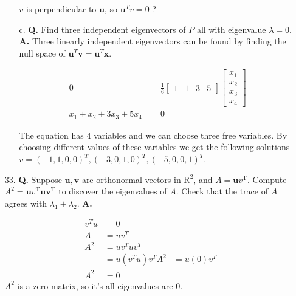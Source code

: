 \documentclass[main.tex]{subfiles}
\begin{document}
\begin{enumerate}
\begin{enumerate}
        $v$ is perpendicular to $\mathbf{u}$, so $\mathbf{u}^{T} v=0$ ?
        
        \item [c.] \textbf{Q.} Find three independent eigenvectors of $P$ all with eigenvalue $\lambda=0$. 
        \textbf{A.}
        Three linearly independent eigenvectors can be found by finding the null space of $\mathbf{u}^{T} \boldsymbol{v}=\mathbf{u}^{T} \mathbf{x}$.

        $$
        \begin{aligned}
        0&=\frac{1}{6}\left[\begin{array}{llll}
        1 & 1 & 3 & 5
        \end{array}\right]\left[\begin{array}{l}
        x_{1} \\
        x_{2} \\
        x_{3} \\
        x_{4}
        \end{array}\right]\\
        x_{1}+x_{2}+3 x_{3}+5 x_{4}&=0
        \end{aligned}
        $$

        The equation has 4 variables and we can choose three free variables. By choosing different values of these variables we get the following solutions $v=(-1,1,0,0)^{T},(-3,0,1,0)^{T},(-5,0,0,1)^{T}$.

        
    \end{enumerate}

    \item [33.] \textbf{Q.} Suppose $\boldsymbol{u}, \boldsymbol{v}$ are orthonormal vectors in $\mathrm{R}^{2}$, and $A=\boldsymbol{u} v^{\mathrm{T}}$. Compute $A^{2}=\boldsymbol{u} v^{\mathrm{T}} \boldsymbol{u} \boldsymbol{v}^{\mathrm{T}}$ to discover the eigenvalues of $A$. Check that the trace of $A$ agrees with $\lambda_{1}+\lambda_{2}$. 
    \textbf{A.}

    $$
    \begin{aligned}
    v^{T} u &=0\\
    A&=u v^{T}\\
    A^{2} &=u v^{T} u v^{T} \\
    &=u\left(v^{T} u\right) v^{T}
    A^{2} &=u(0) v^{T} \\
    A^{2} &=0
    \end{aligned}
    $$
    $A^{2}$ is a zero matrix, so it's all eigenvalues are 0. 


\end{enumerate}
\end{document}
